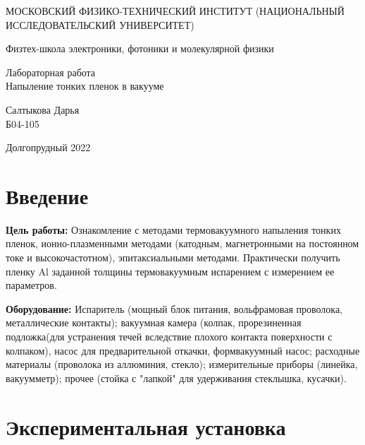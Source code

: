 \documentclass[a4paper,12pt]{article} %
\begin{document}
	
	\begin{titlepage}
	\begin{center}
		{\large МОСКОВСКИЙ ФИЗИКО-ТЕХНИЧЕСКИЙ ИНСТИТУТ (НАЦИОНАЛЬНЫЙ ИССЛЕДОВАТЕЛЬСКИЙ УНИВЕРСИТЕТ)}
	\end{center}
	\begin{center}
		{\large Физтех-школа электроники, фотоники и молекулярной физики}
	\end{center}
	
	
	\vspace{4.5cm}
	{\huge
		\begin{center}
			{Лабораторная работа}\\
			Напыление тонких пленок в вакууме
		\end{center}
	}
	\vspace{2cm}
	\begin{flushright}
		{\LARGE Салтыкова Дарья \\
			\vspace{0.5cm}
			Б04-105}
	\end{flushright}
	\vspace{8cm}
	\begin{center}
		Долгопрудный 2022
	\end{center}
\end{titlepage}

\section{Введение}

\noindent
\textbf{Цель работы:} Ознакомление с методами термовакуумного напыления тонких пленок, ионно-плазменными методами (катодным, магнетронными на постоянном токе и высокочастотном), эпитаксиальными методами. Практически получить пленку Al заданной толщины термовакуумным испарением с измерением ее параметров.

\medskip

\noindent
\textbf{Оборудование:} Испаритель (мощный блок питания, вольфрамовая проволока, металлические контакты); вакуумная камера (колпак, прорезиненная подложка(для устранения течей вследствие плохого контакта поверхности с колпаком), насос для предварительной откачки, формвакуумный насос; расходные материалы (проволока из аллюминия, стекло); измерительные приборы (линейка, вакуумметр); прочее (стойка с "лапкой" для удерживания стеклышка, кусачки).

\section{Экспериментальная установка}
\end{document}
